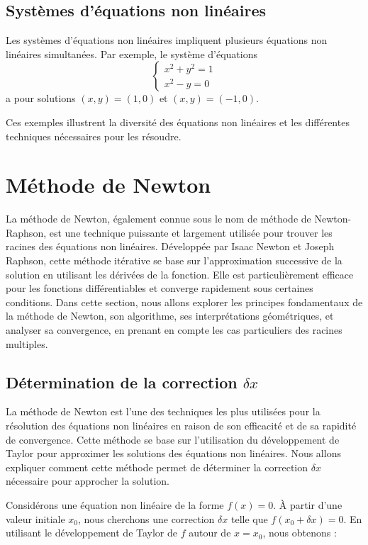 \documentclass{article}
\begin{document}
\subsection{Systèmes d'équations non linéaires}
Les systèmes d'équations non linéaires impliquent plusieurs équations non linéaires simultanées. Par exemple, le système d'équations
\[
\begin{cases}
x^2 + y^2 = 1 \\
x^2 - y = 0
\end{cases}
\]
a pour solutions $(x, y) = (1, 0)$ et $(x, y) = (-1, 0)$.

Ces exemples illustrent la diversité des équations non linéaires et les différentes techniques nécessaires pour les résoudre.

\section{Méthode de Newton}
La méthode de Newton, également connue sous le nom de méthode de Newton-Raphson, est une technique puissante et largement utilisée pour trouver les racines des équations non linéaires. Développée par Isaac Newton et Joseph Raphson, cette méthode itérative se base sur l'approximation successive de la solution en utilisant les dérivées de la fonction. Elle est particulièrement efficace pour les fonctions différentiables et converge rapidement sous certaines conditions. Dans cette section, nous allons explorer les principes fondamentaux de la méthode de Newton, son algorithme, ses interprétations géométriques, et analyser sa convergence, en prenant en compte les cas particuliers des racines multiples.

\subsection{Détermination de la correction \(\delta x\)}
La méthode de Newton est l'une des techniques les plus utilisées pour la résolution des équations non linéaires en raison de son efficacité et de sa rapidité de convergence. Cette méthode se base sur l'utilisation du développement de Taylor pour approximer les solutions des équations non linéaires. Nous allons expliquer comment cette méthode permet de déterminer la correction \(\delta x\) nécessaire pour approcher la solution.

Considérons une équation non linéaire de la forme \( f(x) = 0 \). À partir d'une valeur initiale \( x_0 \), nous cherchons une correction \(\delta x\) telle que \( f(x_0 + \delta x) = 0 \). En utilisant le développement de Taylor de \( f \) autour de \( x = x_0 \), nous obtenons :
\end{document}
